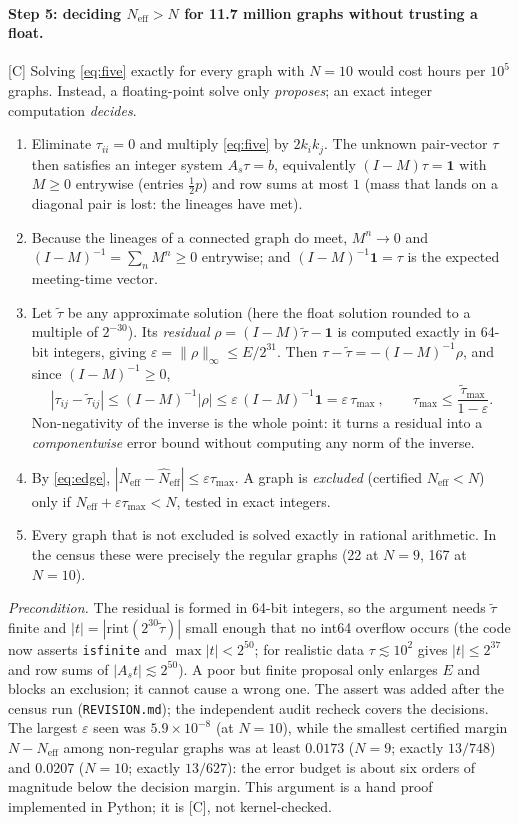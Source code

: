 \documentclass[10pt]{article}
\newcommand{\tier}[1]{\textsf{[#1]}}
\newcommand{\tC}{\tier{C}}
\newcommand{\Neff}{N_{\mathrm{eff}}}
\begin{document}
\paragraph{Step 5: deciding $\Neff>N$ for 11.7 million graphs without trusting a float.}\tC{} Solving \eqref{eq:five} exactly for every graph with $N=10$ would cost
hours per $10^5$ graphs. Instead, a floating-point solve only \emph{proposes}; an exact integer computation \emph{decides}.
\begin{enumerate}\itemsep=1pt
\item Eliminate $\tau_{ii}=0$ and multiply \eqref{eq:five} by $2k_ik_j$. The unknown pair-vector $\tau$ then satisfies an integer system $A_s\tau=b$, equivalently $(I-M)\tau=\mathbf 1$ with $M\ge0$ entrywise
 (entries $\tfrac12p$) and row sums at most $1$ (mass that lands on a diagonal pair is lost: the lineages have met).
\item Because the lineages of a connected graph do meet, $M^n\to0$ and $(I-M)^{-1}=\sum_nM^n\ge0$ entrywise; and $(I-M)^{-1}\mathbf 1=\tau$ is the expected meeting-time vector.
\item Let $\tilde\tau$ be any approximate solution (here the float solution rounded to a multiple of $2^{-30}$). Its \emph{residual} $\rho=(I-M)\tilde\tau-\mathbf1$ is computed
 exactly in 64-bit integers, giving $\varepsilon=\|\rho\|_\infty\le E/2^{31}$. Then $\tau-\tilde\tau=-(I-M)^{-1}\rho$, and since $(I-M)^{-1}\ge0$,
 \[|\tau_{ij}-\tilde\tau_{ij}|\le(I-M)^{-1}|\rho|\le\varepsilon\,(I-M)^{-1}\mathbf1=\varepsilon\,\tau_{\max}\ ,\qquad\tau_{\max}\le\frac{\tilde\tau_{\max}}{1-\varepsilon}.\]
 Non-negativity of the inverse is the whole point: it turns a residual into a \emph{componentwise} error bound without computing any norm of the inverse.
\item By \eqref{eq:edge}, $|\Neff-\hat N_{\mathrm{eff}}|\le\varepsilon\tau_{\max}$. A graph is \emph{excluded} (certified $\Neff<N$) only if $\hat N_{\mathrm{eff}}+\varepsilon\tau_{\max}<N$, tested in exact integers.
\item Every graph that is not excluded is solved exactly in rational arithmetic. In the census these were precisely the regular graphs (22 at $N=9$, 167 at $N=10$).
\end{enumerate}
\emph{Precondition.} The residual is formed in 64-bit integers, so the argument needs $\tilde\tau$ finite and $|t|=|\mathrm{rint}(2^{30}\tilde\tau)|$ small enough that no int64 overflow occurs (the
code now asserts \texttt{isfinite} and $\max|t|<2^{50}$; for realistic data $\tau\lesssim10^2$ gives $|t|\le2^{37}$ and row sums of $|A_st|\lesssim2^{50}$). A poor but finite proposal only enlarges $E$ and blocks an exclusion; it cannot cause a wrong one. The assert was added after the census run (\texttt{REVISION.md}); the independent audit recheck covers the decisions.
The largest $\varepsilon$ seen was $5.9\times10^{-8}$ (at $N=10$), while the smallest certified margin $N-\Neff$ among non-regular graphs was at least $0.0173$ ($N=9$; exactly $13/748$) and $0.0207$ ($N=10$; exactly $13/627$): the
error budget is about six orders of magnitude below the decision margin. This argument is a hand proof implemented in Python; it is \tC{}, not kernel-checked.
\end{document}
